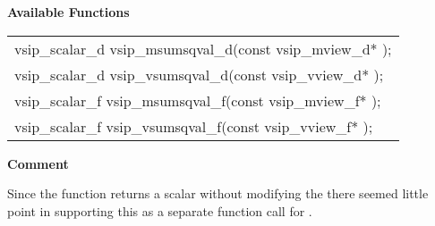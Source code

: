 \cvsiplh
\newline \hspace*{.8cm} \vspace*{.1cm} \textbf{Available Functions }
\newline \hspace*{1.1cm} {
\ttfamily
\begin{tabular}[H]{l}
vsip\_scalar\_d vsip\_msumsqval\_d(const vsip\_mview\_d* );\\
vsip\_scalar\_d vsip\_vsumsqval\_d(const vsip\_vview\_d* );\\
vsip\_scalar\_f vsip\_msumsqval\_f(const vsip\_mview\_f* );\\
vsip\_scalar\_f vsip\_vsumsqval\_f(const vsip\_vview\_f* );\\
\end{tabular}
}
\pyjvsiph
{}
\newline \hspace*{.8cm} \textbf{Comment}
\newline\hspace*{.9cm}\parbox{10.8cm}{\vspace*{.1cm}Since the  function returns a scalar without modifying the  there seemed little point in supporting this as a separate function call for \pyjv.}
